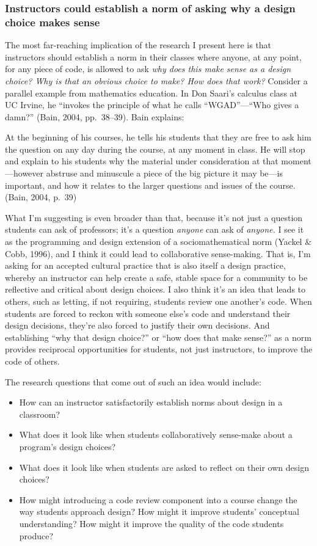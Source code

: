 \subsubsection{Instructors could establish a norm of asking why a design choice makes sense}\label{instructors-could-establish-a-norm-of-asking-why-a-design-choice-makes-sense}

The most far-reaching implication of the research I present here is that instructors should establish a norm in their classes where anyone, at any point, for any piece of code, is allowed to ask \emph{why does this make sense as a design choice? Why is that an obvious choice to make? How does that work?} Consider a parallel example from mathematics education. In Don Saari's calculus class at UC Irvine, he ``invokes the principle of what he calls ``WGAD''---``Who gives a damn?'' (Bain, 2004, pp.~38--39). Bain explains:

At the beginning of his courses, he tells his students that they are free to ask him the question on any day during the course, at any moment in class. He will stop and explain to his students why the material under consideration at that moment---however abstruse and minuscule a piece of the big picture it may be---is important, and how it relates to the larger questions and issues of the course. (Bain, 2004, p.~39)

What I'm suggesting is even broader than that, because it's not just a question students can ask of professors; it's a question \emph{anyone} can ask of \emph{anyone.} I see it as the programming and design extension of a sociomathematical norm (Yackel \& Cobb, 1996), and I think it could lead to collaborative sense-making. That is, I'm asking for an accepted cultural practice that is also itself a design practice, whereby an instructor can help create a safe, stable space for a community to be reflective and critical about design choices. I also think it's an idea that leads to others, such as letting, if not requiring, students review one another's code. When students are forced to reckon with someone else's code and understand their design decisions, they're also forced to justify their own decisions. And establishing ``why that design choice?'' or ``how does that make sense?'' as a norm provides reciprocal opportunities for students, not just instructors, to improve the code of others.

The research questions that come out of such an idea would include:

\begin{itemize}
\item
  How can an instructor satisfactorily establish norms about design in a classroom?
\item
  What does it look like when students collaboratively sense-make about a program's design choices?
\item
  What does it look like when students are asked to reflect on their own design choices?
\item
  How might introducing a code review component into a course change the way students approach design? How might it improve students' conceptual understanding? How might it improve the quality of the code students produce?
\end{itemize}

